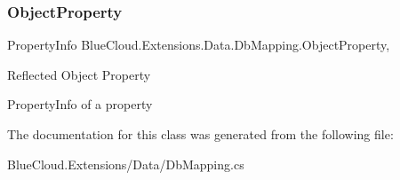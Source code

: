 \subsubsection{\texorpdfstring{Object\+Property}{ObjectProperty}}
{\footnotesize\ttfamily Property\+Info Blue\+Cloud.\+Extensions.\+Data.\+Db\+Mapping.\+Object\+Property\hspace{0.3cm}{\ttfamily [get]}, {\ttfamily [set]}}



Reflected Object Property 

Property\+Info of a property

The documentation for this class was generated from the following file\+:\begin{DoxyCompactItemize}
\item 
Blue\+Cloud.\+Extensions/\+Data/Db\+Mapping.\+cs\end{DoxyCompactItemize}
